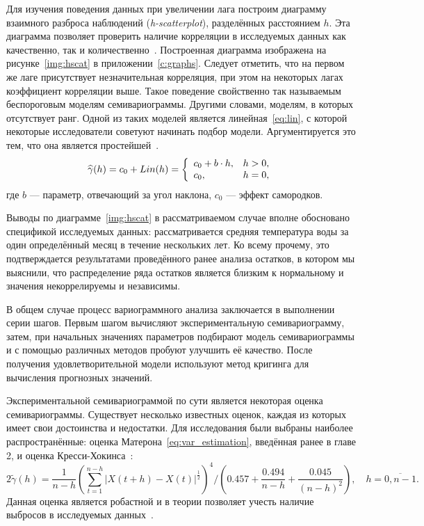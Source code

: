 Для изучения поведения данных при увеличении лага построим диаграмму взаимного разброса наблюдений (\textit{h-scatterplot}), разделённых расстоянием $ h $. Эта диаграмма позволяет проверить наличие корреляции в исследуемых данных как качественно, так и количественно~\cite{saveliev2012}. Построенная диаграмма изображена на рисунке~\ref{img:hscat} в приложении~\ref{c:graphs}. Следует отметить, что на первом же лаге присутствует незначительная корреляция, при этом на некоторых лагах коэффициент корреляции выше. Такое поведение свойственно так называемым беспороговым моделям семивариограммы. Другими словами, моделям, в которых отсутствует ранг. Одной из таких моделей является линейная~\eqref{eq:lin}, с которой некоторые исследователи советуют начинать подбор модели. Аргументируется это тем, что она является простейшей~\cite{saveliev2012}.
\begin{equation}
\label{eq:lin}
	\widehat{\gamma}(h) = c_0 + Lin(h) = \left\{
 \begin{array}{l l}
   c_0 + b \cdot h, & h > 0, \\
   c_0, & h = 0,
 \end{array} \right.
\end{equation}
где $ b $ --- параметр, отвечающий за угол наклона, $ c_0 $ --- эффект самородков.

Выводы по диаграмме~\ref{img:hscat} в рассматриваемом случае вполне обосновано спецификой исследуемых данных: рассматривается средняя температура воды за один определённый месяц в течение нескольких лет. Ко всему прочему, это подтверждается результатами проведённого ранее анализа остатков, в котором мы выяснили, что распределение ряда остатков является близким к нормальному и значения некоррелируемы и независимы.

В общем случае процесс вариограммного анализа заключается в выполнении серии шагов. Первым шагом вычисляют экспериментальную семивариограмму, затем, при начальных значениях параметров подбирают модель семивариограммы и с помощью различных методов пробуют улучшить её качество. После получения удовлетворительной модели используют метод кригинга для вычисления прогнозных значений.

Экспериментальной семивариограммой по сути является некоторая оценка семивариограммы. Существует несколько известных оценок, каждая из которых имеет свои достоинства и недостатки. Для исследования были выбраны наиболее распространённые: оценка Матерона~\eqref{eq:var_estimation}, введённая ранее в главе 2, и оценка Кресси-Хокинса~\cite{cressie1993statistics, dutter}:
\begin{equation}
\label{eq:cressie}
	2 \tilde{\gamma}(h) = \frac{1}{n - h} (\sum_{t = 1}^{n - h} | X(t + h) - X(t) |^{\frac{1}{2}} )^4 / (0.457 + \frac{0.494}{n - h} + \frac{0.045}{(n - h)^2}), \quad h = \overline{0, n - 1}.
\end{equation}
Данная оценка является робастной и в теории позволяет учесть наличие выбросов в исследуемых данных~\cite{MINGOTI2008}.

